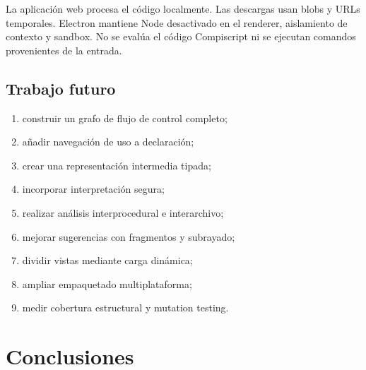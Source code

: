 \documentclass[11pt,letterpaper,oneside]{report}
\begin{document}
La aplicación web procesa el código localmente. Las descargas usan blobs y URLs
temporales. Electron mantiene Node desactivado en el renderer, aislamiento de contexto
y sandbox. No se evalúa el código Compiscript ni se ejecutan comandos provenientes de
la entrada.

\section{Trabajo futuro}

\begin{enumerate}
  \item construir un grafo de flujo de control completo;
  \item añadir navegación de uso a declaración;
  \item crear una representación intermedia tipada;
  \item incorporar interpretación segura;
  \item realizar análisis interprocedural e interarchivo;
  \item mejorar sugerencias con fragmentos y subrayado;
  \item dividir vistas mediante carga dinámica;
  \item ampliar empaquetado multiplataforma;
  \item medir cobertura estructural y mutation testing.
\end{enumerate}

\chapter{Conclusiones}
\end{document}
